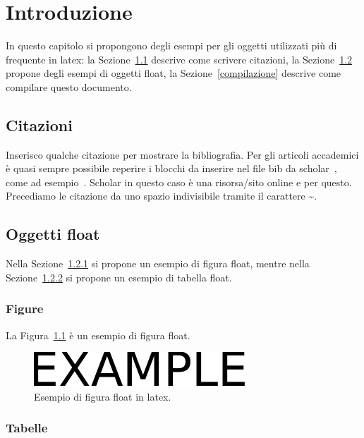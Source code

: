 \chapter{Introduzione}
\label{introduction}

In questo capitolo si propongono degli esempi per gli oggetti utilizzati più di frequente in latex: la Sezione~\ref{citazioni} descrive come scrivere citazioni, la Sezione~\ref{oggetti-float} propone degli esempi di oggetti float, la Sezione~\ref{compilazione} descrive come compilare questo documento.

\section{Citazioni}
\label{citazioni}

Inserisco qualche citazione per mostrare la bibliografia. Per gli articoli accademici è quasi sempre possibile reperire i blocchi da inserire nel file bib da scholar~\cite{google:scholar}, come ad esempio~\cite{feige:zero}. Scholar in questo caso è una risorsa/sito online e per questo. Precediamo le citazione da uno spazio indivisibile tramite il carattere \textasciitilde.

\section{Oggetti float}
\label{oggetti-float}

Nella Sezione~\ref{figure-float} si propone un esempio di figura float, mentre nella Sezione~\ref{tabelle-float} si propone un esempio di tabella float.

\subsection{Figure}
\label{figure-float}

La Figura~\ref{fig:esempio} è un esempio di figura float.

\begin{figure}[htb]
    \centering
    \includegraphics[width=.4\columnwidth]{figures/example.pdf}
    \caption{Esempio di figura float in latex.}
\label{fig:esempio}
\end{figure}

\subsection{Tabelle}
\label{tabelle-float}

